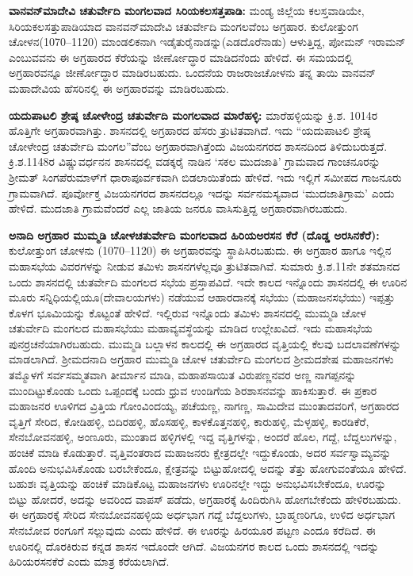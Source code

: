 \textbf{ವಾನವನ್​ಮಾದೇವಿ ಚತುರ್ವೇದಿ ಮಂಗಲವಾದ ಸಿರಿಯಕಲಸತ್ತಪಾಡಿ: }ಮಂಡ್ಯ ಜಿಲ್ಲೆಯ ಕಲಸ್ತವಾಡಿಯೇ, ಸಿರಿಯಕಲಸತ್ತುಪಾಡಿಯಾದ ವಾನವನ್​ಮಾದೇವಿ ಚತುರ್ವೇದಿ ಮಂಗಲವೆಂಬ ಅಗ್ರಹಾರ. ಕುಲೋತ್ತುಂಗ ಚೋಳನ(1070–1120) ಮಾಂಡಲಿಕನಾಗಿ ಇಡೈತುರೈನಾಡನ್ನು(ಎಡದೊರೆನಾಡು) ಆಳುತ್ತಿದ್ದ, ಪೋಮನ್​ ಇರಾಮನ್​ ಎಂಬುವವನು ಈ ಅಗ್ರಹಾರದ ಕೆರೆಯನ್ನು ಜೀರ್ಣೋದ್ಧಾರ ಮಾಡಿದನೆಂದು ಹೇಳಿದೆ.  ಈ ಸಮಯದಲ್ಲಿ ಅಗ್ರಹಾರವನ್ನೂ ಜೀರ್ಣೋದ್ಧಾರ ಮಾಡಿರಬಹುದು. ಒಂದನೆಯ ರಾಜರಾಜಚೋಳನು ತನ್ನ ತಾಯಿ ವಾನವನ್​ ಮಹಾದೇವಿಯ ಹೆಸರಿನಲ್ಲಿ ಈ ಅಗ್ರಹಾರವನ್ನು ಮಾಡಿರಬಹುದು.

\textbf{ಯದುಪಾಟಲಿ ಶ್ರೇಷ್ಠ ಚೋಳೇಂದ್ರ ಚತುರ್ವೇದಿ ಮಂಗಲವಾದ ಮಾರೆಹಳ್ಳಿ:} ಮಾರೆಹಳ್ಳಿಯನ್ನು ಕ್ರಿ.ಶ. 1014ರ ಹೊತ್ತಿಗೇ ಅಗ್ರಹಾರವಾಗಿತ್ತು. ಶಾಸನದಲ್ಲಿ ಅಗ್ರಹಾರದ ಹೆಸರು ತ್ರುಟಿತವಾಗಿದೆ. ಇದು “ಯದುಪಾಟಲಿ ಶ್ರೇಷ್ಠ ಚೋಳೇಂದ್ರ ಚತುರ್ವೇದಿ ಮಂಗಲ”ವೆಂಬ ಅಗ್ರಹಾರವಾಗಿತ್ತೆಂದು ವಿಜಯನಗರದ ಶಾಸನದಿಂದ ತಿಳಿದುಬರುತ್ತದೆ.  ಕ್ರಿ.ಶ.1148ರ ವಿಷ್ಣುವರ್ಧನನ ಶಾಸನದಲ್ಲಿ ವಡಕ್ಕರೈ ನಾಡಿನ ‘ಸಕಲ ಮುದಜಾತಿ’ ಗ್ರಾಮವಾದ ಗಾಂಚನೂರನ್ನು ಶ‍್ರೀಮತ್​ ಸಿಂಗಪೆರುಮಾಳ್​ಗೆ ಧಾರಾಪೂರ್ವಕವಾಗಿ ಬಿಡಲಾಯಿತೆಂದು ಹೇಳಿದೆ. ಇದು ಇಲ್ಲಿಗೆ ಸಮೀಪದ ಗಾಜನೂರು ಗ್ರಾಮವಾಗಿದೆ. ಪೂರ್ವೋಕ್ತ ವಿಜಯನಗರದ ಶಾಸನದಲ್ಲೂ ಇದನ್ನು ಸರ್ವನಮಸ್ಯವಾದ ‘ಮುದಜಾತಿಗ್ರಾಮ’ ಎಂದು ಹೇಳಿದೆ. ಮುದಜಾತಿ ಗ್ರಾಮವೆಂದರೆ ಎಲ್ಲ ಜಾತಿಯ ಜನರೂ ವಾಸಿಸುತ್ತಿದ್ದ ಅಗ್ರಹಾರವಾಗಿರಬಹುದು.

\textbf{ಅನಾದಿ ಅಗ್ರಹಾರ ಮುಮ್ಮಡಿ ಚೋಳಚತುರ್ವೇದಿ ಮಂಗಲವಾದ ಹಿರಿಯಅರಸನ ಕೆರೆ (ದೊಡ್ಡ ಅರಸಿನಕೆರೆ): } ಕುಲೋತ್ತುಂಗ ಚೋಳನು (1070–1120) ಈ ಅಗ್ರಹಾರವನ್ನು ಸ್ಥಾಪಿಸಿರಬಹುದು. ಈ ಅಗ್ರಹಾರ ಹಾಗೂ ಇಲ್ಲಿನ ಮಹಾಸಭೆಯ ವಿವರಗಳನ್ನು ನೀಡುವ ತಮಿಳು ಶಾಸನಗಳೆಲ್ಲವೂ ತ್ರುಟಿತವಾಗಿವೆ. ಸುಮಾರು ಕ್ರಿ.ಶ.11ನೇ ಶತಮಾನದ ಒಂದು ಶಾಸನದಲ್ಲಿ ಚುತರ್ವೇದಿ ಮಂಗಲದ ಸಭೆಯ ಪ್ರಸ್ತಾಪವಿದೆ. ಇದೇ ಕಾಲದ ಇನ್ನೊಂದು ಶಾಸನದಲ್ಲಿ ಈ ಊರಿನ ಮೂರು ಸನ್ನಿಧಿಯಲ್ಲಿಯೂ(ದೇವಾಲಯಗಳು) ನಡೆಯುವ ಆಹಾರದಾನಕ್ಕೆ ಸಭೆಯು (ಮಹಾಜನಸಭೆಯು) ಇಪ್ಪತ್ತು ಕೊಳಗ ಭೂಮಿಯನ್ನು ಕೊಟ್ಟಂತೆ ಹೇಳಿದೆ. ಇಲ್ಲಿರುವ ಇನ್ನೊಂದು ತಮಿಳು ಶಾಸನದಲ್ಲಿ ಮುಮ್ಮಡಿ ಚೋಳ ಚತುರ್ವೇದಿ ಮಂಗಲದ ಮಹಾಸಭೆಯು ಮಹಾವ್ಯವಸ್ಥೆಯನ್ನು ಮಾಡಿದ ಉಲ್ಲೇಖವಿದೆ. ಇದು ಮಹಾಸಭೆಯ ಪುನರ್ರಚನೆಯಾಗಿರಬಹುದು. ಮುಮ್ಮಡಿ ಬಲ್ಲಾಳನ ಕಾಲದಲ್ಲಿ ಈ ಅಗ್ರಹಾರದ ವೃತ್ತಿಯಲ್ಲಿ ಕೆಲವು ಬದಲಾವಣೆಗಳನ್ನು ಮಾಡಲಾಗಿದೆ. ಶ‍್ರೀಮದನಾದಿ ಅಗ್ರಹಾರ ಮುಮ್ಮಡಿ ಚೋಳ ಚತುರ್ವೇದಿ ಮಂಗಲದ ಶ‍್ರೀಮದಶೇಷ ಮಹಾಜನಗಳು ತಮ್ಮೊಳಗೆ ಸರ್ವಸಮ್ಮತವಾಗಿ ತೀರ್ಮಾನ ಮಾಡಿ, ಮಹಾಪಸಾಯಿತ ವಿರುಪಣ್ಣನವರ ಅಣ್ಣ ನಾಗಪ್ಪನನ್ನು ಮುಂದಿಟ್ಟುಕೊಂಡು ಒಂದು ಒಪ್ಪಂದಕ್ಕೆ ಬಂದು ಧ್ರುವ ಉಂಡಿಗೆಯ ಶಿರಶಾಸನವನ್ನು ಹಾಕಿಸುತ್ತಾರೆ. ಈ ಪ್ರಕಾರ ಮಹಾಜನರ ಊಳಿಗದ ವ್ರಿತ್ತಿಯ ಗೋಂವಿಂದಯ್ಯ, ಪಚೆಯಣ್ಣ, ನಾಗಣ್ಣ, ಸಾಮಿದೇವ ಮುಂತಾದವರಿಗೆ, ಅಗ್ರಹಾರದ ವೃತ್ತಿಗೆ ಸೇರಿದ, ಕೋಡಿಹಳ್ಳಿ, ಬಿದಿರಹಳ್ಳಿ, ಹೊಸಹಳ್ಳಿ, ಕಾಳಕೊತ್ತನಹಳ್ಳಿ, ಕಾರುಹಳ್ಳಿ, ಮೆಳ್ಳಹಳ್ಳಿ, ಕಾರಡಿಕೆರೆ, ಸೇನಬೋವನಹಳ್ಳಿ, ಅಂಣೂರು, ಮುಂತಾದ ಹಳ್ಳಿಗಳಲ್ಲಿ ಇದ್ದ ವೃತ್ತಿಗಳನ್ನು, ಅಂದರೆ ಹೊಲ, ಗದ್ದೆ, ಬೆದ್ದಲುಗಳನ್ನು, ಹಂಚಿಕೆ ಮಾಡಿ ಕೊಡುತ್ತಾರೆ. ವೃತ್ತಿವಂತರಾದ ಮಹಾಜನರು ಕ್ಷೇತ್ರದಲ್ಲೇ ಇದ್ದುಕೊಂಡು, ಅದರ ಸರ್ವಸ್ವಾಮ್ಯವನ್ನು ಹೊಂದಿ ಅನುಭವಿಸಿಕೊಂಡು ಬರಬೇಕೆಂದೂ, ಕ್ಷೇತ್ರವನ್ನು ಬಿಟ್ಟುಹೋದಲ್ಲಿ ಅದನ್ನು ತೆತ್ತು ಹೋಗುವಂತೆಯೂ ಹೇಳಿದೆ. ಬಹುಶಃ ವೃತ್ತಿಯನ್ನು ಹಂಚಿಕೆ ಮಾಡಿಕೊಟ್ಟ ಮಹಾಜನಗಳು ಊರಿನಲ್ಲೇ ಇದ್ದು ಅನುಭವಿಸಬೇಕೆಂದೂ, ಊರನ್ನು ಬಿಟ್ಟು ಹೋದರೆ, ಅದನ್ನು ಅವರಿಂದ ವಾಪಸ್​ ಪಡೆದು, ಅಗ್ರಹಾರಕ್ಕೆ ಹಿಂದಿರುಗಿಸಿ ಹೋಗಬೇಕೆಂದು ಹೇಳಿರಬಹುದು. ಈ ಅಗ್ರಹಾರಕ್ಕೆ ಸೇರಿದ ಸೇನಬೋವನಹಳ್ಳಿಯ ಅರ್ಧಭಾಗ ಗದ್ದೆ ಬೆದ್ದಲುಗಳು, ಬ್ರಾಹ್ಮಣರಿಗೂ, ಉಳಿದ ಅರ್ಧಭಾಗ ಸೇನಬೋವ ರಂಗೂಗೆ ಸಲ್ಲುವುದು ಎಂದು ಹೇಳಿದೆ. ಈ ಊರನ್ನು ಹಿರಯೂರ ಪಟ್ಟಣ ಎಂದೂ ಕರೆದಿದೆ. ಈ ಊರಿನಲ್ಲಿ ದೊರಕಿರುವ ಕನ್ನಡ ಶಾಸನ ಇದೊಂದೇ ಆಗಿದೆ. ವಿಜಯನಗರ ಕಾಲದ ಒಂದು ಶಾಸನದಲ್ಲಿ ಇದನ್ನು ಹಿರಿಯರಸನಕೆರೆ ಎಂದು ಮಾತ್ರ ಕರೆಯಲಾಗಿದೆ.


